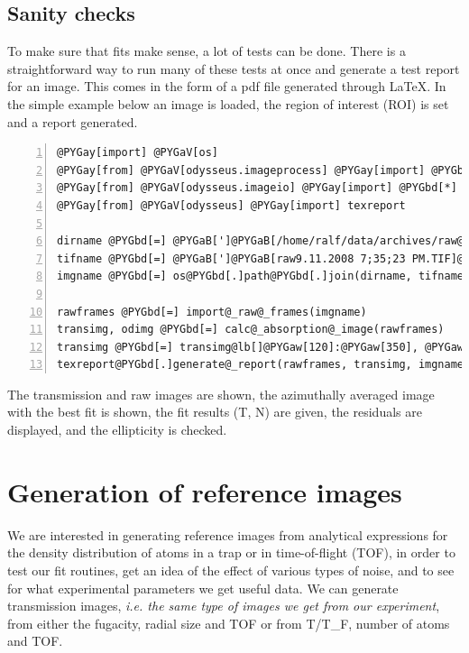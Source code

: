 \documentclass[letterpaper,10pt,english]{manual}
\begin{document}
\subsection{Sanity checks}

To make sure that fits make sense, a lot of tests can be done. There is a straightforward way to run many of these tests at once and generate a test report for an image. This comes in the form of a pdf file generated through LaTeX. In the simple example below an image is loaded, the region of interest (ROI) is set and a report generated.

\begin{Verbatim}[commandchars=@\[\],numbers=left,firstnumber=1,stepnumber=1]
@PYGay[import] @PYGaV[os]
@PYGay[from] @PYGaV[odysseus.imageprocess] @PYGay[import] @PYGbd[*]
@PYGay[from] @PYGaV[odysseus.imageio] @PYGay[import] @PYGbd[*]
@PYGay[from] @PYGaV[odysseus] @PYGay[import] texreport

dirname @PYGbd[=] @PYGaB[']@PYGaB[/home/ralf/data/archives/raw@_frames/]@PYGaB[']
tifname @PYGbd[=] @PYGaB[']@PYGaB[raw9.11.2008 7;35;23 PM.TIF]@PYGaB[']
imgname @PYGbd[=] os@PYGbd[.]path@PYGbd[.]join(dirname, tifname)

rawframes @PYGbd[=] import@_raw@_frames(imgname)
transimg, odimg @PYGbd[=] calc@_absorption@_image(rawframes)
transimg @PYGbd[=] transimg@lb[]@PYGaw[120]:@PYGaw[350], @PYGaw[50]:@PYGaw[275]@rb[] @PYGaE[@# ROI]
texreport@PYGbd[.]generate@_report(rawframes, transimg, imgname)
\end{Verbatim}

The transmission and raw images are shown, the azimuthally averaged image with the best fit is shown, the fit results (T, N) are given, the residuals are displayed, and the ellipticity is checked.

\resetcurrentobjects
\hypertarget{--doc-refimages}{}
\hypertarget{module-odysseus.refimages}{}

\hypertarget{module-odysseus.refimages}{}\section{Generation of reference images}

We are interested in generating reference images from analytical expressions for the density distribution of atoms in a trap or in time-of-flight (TOF), in order to test our fit routines, get an idea of the effect of various types of noise, and to see for what experimental parameters we get useful data. We can generate transmission images, \emph{i.e. the same type of images we get from our experiment}, from either the fugacity, radial size and TOF or from T/T\_F, number of atoms and TOF.
\end{document}
